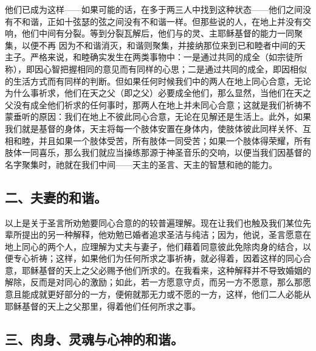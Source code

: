 他们已成为这样——如果可能的话，在多于两三人中找到这种状态——他们之间没有不和谐，正如十弦瑟的弦之间没有不和谐一样。但那些说的人，在地上并没有交响，他们中间有分裂。等到分裂瓦解后，他们与的灵、主耶稣基督的能力一同聚集，以便不再  因为不和谐消灭，和谐则聚集，并接纳那位来到已和睦者中间的天主子。严格来说，和睦确实发生在两类事物中：一是通过共同的成全（如宗徒所称），即因心智把握相同的意见而有同样的心思；二是通过共同的成全，即因相似的生活方式而有同样的判断。但如果任何时候我们中的两人在地上同心合意，无论为什么事祈求，他们在天之父（即之父）必要成全他们，那么显然，当他们在天之父没有成全他们祈求的任何事时，那两人在地上并未同心合意；这就是我们祈祷不蒙垂听的原因：我们在地上不彼此同心合意，无论在见解还是生活上。此外，如果我们就是基督的身体，天主将每一个肢体安置在身体内，使肢体彼此同样关怀、互相和睦，并且如果一个肢体受苦，所有肢体一同受苦；如果一个肢体得荣耀，所有肢体一同喜乐，那么我们就应当操练那源于神圣音乐的交响，以便当我们因基督的名字聚集时，祂就在我们中间——天主的圣言、天主的智慧和祂的能力。\par


\subsection{二、夫妻的和谐。}

以上是关于圣言所劝勉要同心合意的的较普遍理解。现在让我们也触及我们某位先辈所提出的另一种解释，他劝勉已婚者追求圣洁与纯洁；因为，他说，圣言愿意在地上同心的两个人，应理解为丈夫与妻子，他们藉着同意彼此免除肉身的结合，以便专心祈祷；这样，如果他们为任何所求之事祈祷，就必得着，因着这样的同心合意，耶稣基督的天上之父必赐予他们所求的。在我看来，这种解释并不导致婚姻的解除，反而是对同心的激励；如此，若一方愿意守贞，而另一方不愿意，那么那愿意且能成就更好部分的一方，便俯就那无力或不愿的一方，这样，他们二人必能从耶稣基督的天上之父那里，得着他们任何所求之事。\par


\subsection{三、肉身、灵魂与心神的和谐。}

